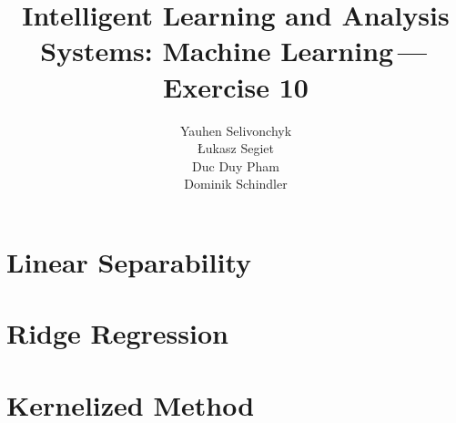 \documentclass[a4paper]{article}
\newcommand{\exnumber}{10}
\begin{document}
\title{Intelligent Learning and Analysis Systems: Machine Learning\,---\,Exercise \exnumber}
\author{Yauhen Selivonchyk\\ {\L}ukasz Segiet\\Duc Duy Pham\\Dominik Schindler}

\maketitle

\section{Linear Separability}



\section{Ridge Regression}


\section{Kernelized Method}

\end{document}
